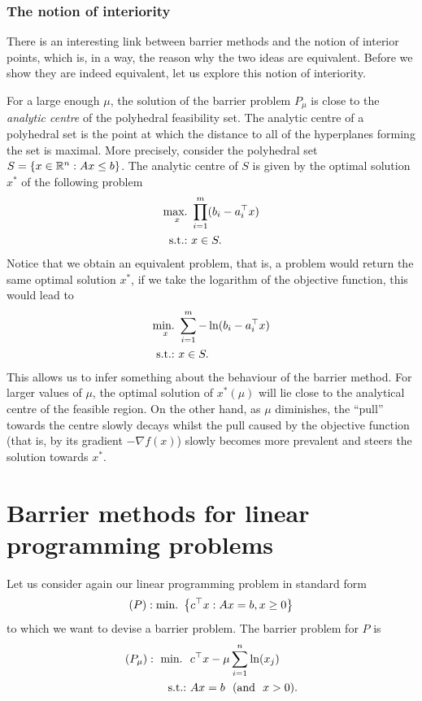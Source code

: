 \subsubsection{The notion of interiority}

There is an interesting link between barrier methods and the notion of interior points, which is, in a way, the reason why the two ideas are equivalent. Before we show they are indeed equivalent, let us explore this notion of interiority.

For a large enough $\mu$, the solution of the barrier problem $P_\mu$ is close to the \emph{analytic centre} of the polyhedral feasibility set. The analytic centre of a polyhedral set is	the point at which the distance to all of the hyperplanes forming the set is maximal. More precisely, consider the polyhedral set $S = \left\{ x \in \mathbb{R}^n : Ax \leq b \right \} $. The analytic centre of $S$ is given by the optimal solution $x^*$ of the following problem
	\begin{align*}
		\mathop{\text{max.~}}_x & \prod_{i=1}^m (b_i - a_i ^\top x) \\
		\mathop{\text{s.t.:~}} & x \in S. 	
	\end{align*}
	Notice that we obtain an equivalent problem, that is, a problem would return the same optimal solution $x^*$, if we take the logarithm of the objective function, this would lead to
	\begin{align*}
		\mathop{\text{min.~}}_x & \sum_{i=1}^m -\ln(b_i - a_i ^\top x) \\
		\mathop{\text{s.t.:~}} & x \in S. 	
	\end{align*}
	This allows us to infer something about the behaviour of the barrier method. For larger values of $\mu$, the optimal solution of $x^*(\mu)$ will lie close to the analytical centre of the feasible region. On the other hand, as $\mu$ diminishes, the ``pull'' towards the centre slowly decays whilst the pull caused by the objective function (that is, by its gradient $-\nabla f(x)$) slowly becomes more prevalent and steers the solution towards $x^*$.


\section{Barrier methods for linear programming problems}

Let us consider again our linear programming problem in standard form 
	$$
	(P) : \mathop{\text{min.~}}\left\{ c^\top x : Ax = b, x \ge 0 \right \}
	$$ 
	to which we want to devise a barrier problem. The barrier problem for $P$ is
	\begin{align*}
		(P_\mu) :~ \mathop{\text{min.~}} \ &c^\top x  - \mu\sum_{i=1}^n \ln(x_j)\\
		\mathop{\text{s.t.:~}} &Ax = b \ \ ( \text{and} \ \ x > 0). 
	\end{align*}
	
